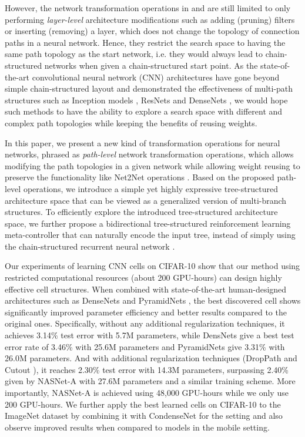 \documentclass{article}
\begin{document}
However, the network transformation operations in \citet{cai2018efficient} and \citet{ashok2017n2n} are still limited to only performing \emph{layer-level} architecture modifications such as adding (pruning) filters or inserting (removing) a layer, which does not change the topology of connection paths in a neural network. Hence, they restrict the search space to having the same path topology as the start network, i.e. they would always lead to chain-structured networks when given a chain-structured start point. As the state-of-the-art convolutional neural network (CNN) architectures have gone beyond simple chain-structured layout and demonstrated the effectiveness of multi-path structures such as Inception models \cite{szegedy2015going}, ResNets \cite{he2016deep} and DenseNets \cite{huang2016densely}, we would hope such methods to have the ability to explore a search space with different and complex path topologies while keeping the benefits of reusing weights.

In this paper, we present a new kind of transformation operations for neural networks, phrased as \emph{path-level} network transformation operations, which allows modifying the path topologies in a given network while allowing weight reusing to preserve the functionality like Net2Net operations \cite{chen2015net2net}. Based on the proposed path-level operations, we introduce a simple yet highly expressive tree-structured architecture space that can be viewed as a generalized version of multi-branch structures. To efficiently explore the introduced tree-structured architecture space, we further propose a bidirectional tree-structured \cite{tai2015improved} reinforcement learning meta-controller that can naturally encode the input tree, instead of simply using the chain-structured recurrent neural network \cite{zoph2017learning}. 

Our experiments of learning CNN cells on CIFAR-10 show that our method using restricted computational resources (about 200 GPU-hours) can design highly effective cell structures. When combined with state-of-the-art human-designed architectures such as DenseNets \cite{huang2016densely} and PyramidNets \cite{han2016deep}, the best discovered cell shows significantly improved parameter efficiency and better results compared to the original ones. Specifically, without any additional regularization techniques, it achieves 3.14\% test error with 5.7M parameters, while DensNets give a best test error rate of 3.46\% with 25.6M parameters and PyramidNets give 3.31\% with 26.0M parameters. And with additional regularization techniques (DropPath \cite{zoph2017learning} and Cutout \cite{devries2017improved}), it reaches 2.30\% test error with 14.3M parameters, surpassing 2.40\% given by NASNet-A \cite{zoph2017learning} with 27.6M parameters and a similar training scheme. More importantly, NASNet-A is achieved using 48,000 GPU-hours while we only use 200 GPU-hours.
We further apply the best learned cells on CIFAR-10 to the ImageNet dataset by combining it with CondenseNet \cite{huang2017condensenet} for the  setting and also observe improved results when compared to models in the mobile setting.
\end{document}
